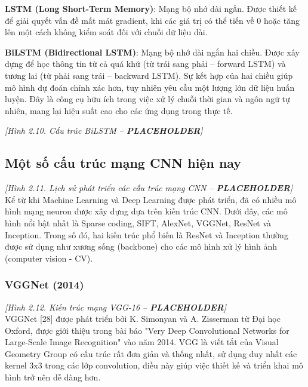 \documentclass[12pt]{report}
\begin{document}
\textbf{LSTM (Long Short-Term Memory)}: Mạng bộ nhớ dài ngắn. Được thiết kế để giải quyết vấn đề mất mát gradient, khi các giá trị có thể tiến về 0 hoặc tăng lên một cách không kiểm soát đối với chuỗi dữ liệu dài.  

\textbf{BiLSTM (Bidirectional LSTM)}: Mạng bộ nhớ dài ngắn hai chiều. Được xây dựng để học thông tin từ cả quá khứ (từ trái sang phải – forward LSTM) và tương lai (từ phải sang trái – backward LSTM). Sự kết hợp của hai chiều giúp mô hình dự đoán chính xác hơn, tuy nhiên yêu cầu một lượng lớn dữ liệu huấn luyện. Đây là công cụ hữu ích trong việc xử lý chuỗi thời gian và ngôn ngữ tự nhiên, mang lại hiệu suất cao cho các ứng dụng trong thực tế.  

\vspace{1em}
\noindent\textit{[Hình 2.10. Cấu trúc BiLSTM – \textbf{PLACEHOLDER}]}\\
\subsection{Một số cấu trúc mạng CNN hiện nay}

\vspace{1em}
\noindent\textit{[Hình 2.11. Lịch sử phát triển các cấu trúc mạng CNN – \textbf{PLACEHOLDER}]}\\

Kể từ khi Machine Learning và Deep Learning được phát triển, đã có nhiều mô hình mạng neuron được xây dựng dựa trên kiến trúc CNN. Dưới đây, các mô hình nổi bật nhất là Sparse coding, SIFT, AlexNet, VGGNet, ResNet và Inception. Trong số đó, hai kiến trúc phổ biến là ResNet và Inception thường được sử dụng như xương sống (backbone) cho các mô hình xử lý hình ảnh (computer vision - CV).

\subsubsection{VGGNet (2014)}

\vspace{1em}
\noindent\textit{[Hình 2.12. Kiến trúc mạng VGG-16 – \textbf{PLACEHOLDER}]}\\

VGGNet [28] được phát triển bởi K. Simonyan và A. Zisserman từ Đại học Oxford, được giới thiệu trong bài báo "Very Deep Convolutional Networks for Large-Scale Image Recognition" vào năm 2014. VGG là viết tắt của Visual Geometry Group có cấu trúc rất đơn giản và thống nhất, sử dụng duy nhất các kernel 3x3 trong các lớp convolution, điều này giúp việc thiết kế và triển khai mô hình trở nên dễ dàng hơn.
\end{document}
